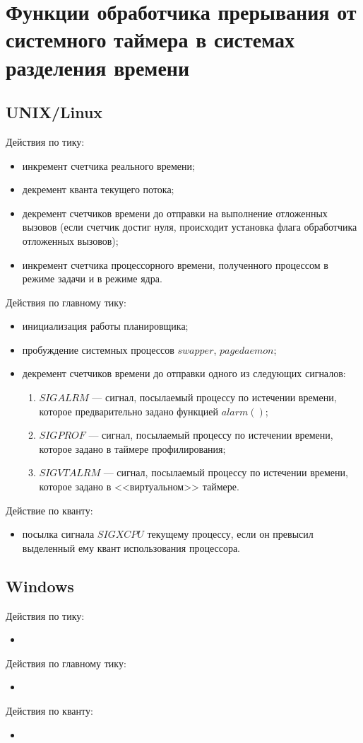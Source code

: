 \chapter{Функции обработчика прерывания от системного таймера в системах разделения времени}

\section{UNIX/Linux}

Действия по тику:

\begin{itemize}
	\item инкремент счетчика реального времени;
	\item декремент кванта текущего потока;
	\item декремент счетчиков времени до отправки на выполнение отложенных вызовов (если счетчик достиг нуля, происходит установка флага обработчика отложенных вызовов);
	\item инкремент счетчика процессорного времени, полученного процессом в режиме задачи и в режиме ядра.
\end{itemize}

Действия по главному тику:

\begin{itemize}
	\item инициализация работы планировщика;
	\item пробуждение системных процессов $swapper$, $pagedaemon$;
	\item декремент счетчиков времени до отправки одного из следующих сигналов:
	\begin{enumerate}
		\item $SIGALRM$ --- сигнал, посылаемый процессу по истечении времени, которое предварительно задано функцией $alarm()$;
		\item $SIGPROF$ --- сигнал, посылаемый процессу по истечении времени, которое задано в таймере профилирования;
		\item $SIGVTALRM$ --- сигнал, посылаемый процессу по истечении времени, которое задано в <<виртуальном>> таймере.
	\end{enumerate}
\end{itemize}

Действие по кванту:

\begin{itemize}
	\item посылка сигнала $SIGXCPU$ текущему процессу, если он превысил выделенный ему квант использования процессора.
\end{itemize}

\section{Windows}

Действия по тику:

\begin{itemize}
	\item
\end{itemize}

Действия по главному тику:

\begin{itemize}
	\item
\end{itemize}

Действия по кванту:

\begin{itemize}
	\item
\end{itemize}